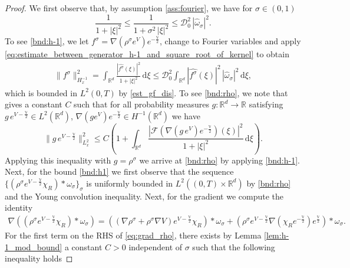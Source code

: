 \documentclass[reqno, 11pt]{amsart}
\numberwithin{equation}{section}
\theoremstyle{definition}
\begin{document}
\begin{proof}
    We first observe that, by assumption \eqref{ass:fourier}, we have for $\sigma\in(0,1)$
    \begin{equation}\label{eq:estimate_between_generator_h-1_and_square_root_of_kernel}
        \frac{1}{1+|\xi|^2}  \leq \frac{1}{1+\sigma^2\, |\xi|^2} \leq \mathcal{D}_0^2\,|\widehat{\omega}_{\sigma}|^2.
    \end{equation}
    To see \ref{bnd:h-1}, we let $f^\sigma = \nabla(\rho^{\sigma} e^V)e^{-\frac{\mathbb{V}}{2}}$, change to Fourier variables and apply \eqref{eq:estimate_between_generator_h-1_and_square_root_of_kernel} to obtain
    \begin{align*}
        \|f^\sigma\|_{H^{-1}_x}^2 = \int_{\mathbb{R}^{d}} \frac{|\widehat{f^\sigma}(\xi)|^2}{1+|\xi|^2} \,\mathrm{d} \xi \leq \mathcal{D}_0^2 \int_{\mathbb{R}^{d}} |\widehat{f^\sigma}(\xi)|^2 \, |\widehat{\omega}_{\sigma}|^2  \,\mathrm{d} \xi ,
    \end{align*}
    which is bounded in $L^2(0,T)$ by \ref{est_gf_dis}. To see \ref{bnd:rho}, we note that \cite[p. 19-20]{carrillo_skrzeczkowski_warnett_2024_stein} gives a constant $C$ such that for all probability measures $g:\mathbb{R}^{d} \to \mathbb{R}$ satisfying $g\, e^{V-\frac{\mathbb{V}}{2}} \in L^2(\mathbb{R}^{d})$, $\nabla(g e^V)e^{-\frac{\mathbb{V}}{2}} \in H^{-1}(\mathbb{R}^{d})$ we have
    $$
    \| g\, e^{V-\frac{\mathbb{V}}{2}} \|^2_{L^2_x} \leq C\left(1 + \int_{\mathbb{R}^{d}} \frac{|\mathcal{F}(\nabla(g\, e^V)e^{-\frac{\mathbb{V}}{2}})(\xi)|^2}{1+|\xi|^2} \,\mathrm{d} \xi \right).
    $$
    Applying this inequality with $g = \rho^{\sigma}$ we arrive at \ref{bnd:rho} by applying \ref{bnd:h-1}. Next, for the bound \ref{bnd:h1} we first observe that the sequence $\{(\rho^\sigma e^{V-\frac{\mathbb{V}}{2}}\chi_R)\ast\omega_\sigma\}_\sigma$ is uniformly bounded in $L^2((0,T)\times \mathbb{R}^{d})$ by \ref{bnd:rho} and the Young convolution inequality. Next, for the gradient we compute the identity
    \begin{align}
        \label{eq:grad_rho}
        \nabla ((\rho^\sigma e^{V-\frac{\mathbb{V}}{2}}\chi_R)\ast\omega_\sigma)
        =((\nabla \rho^\sigma +\rho^\sigma\nabla V)e^{V-\frac{\mathbb{V}}{2}}\chi_R)\ast \omega_\sigma+(\rho^\sigma e^{V-\frac{\mathbb{V}}{2}}\nabla(\chi_R e^{-\frac{\mathbb{V}}{2}})e^{\frac{\mathbb{V}}{2}})\ast\omega_\sigma.
    \end{align}
    For the first term on the RHS of \eqref{eq:grad_rho}, there exists by Lemma \ref{lem:h-1_mod_bound} a constant $C>0$ independent of $\sigma$ such that the following inequality holds

\end{proof}
\end{document}

